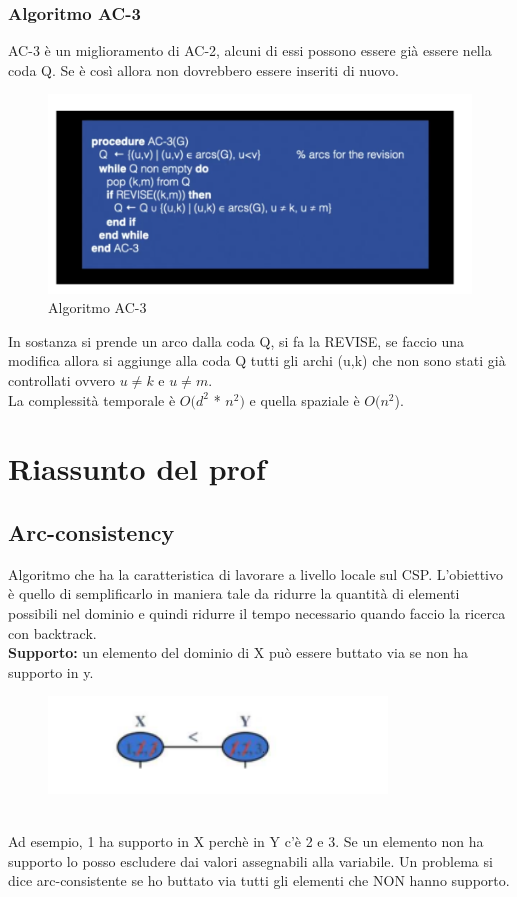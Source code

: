 \subsubsection{Algoritmo AC-3}
AC-3 è un miglioramento di AC-2, alcuni di essi possono essere già essere nella coda Q. Se è così allora non dovrebbero essere inseriti di nuovo.
\begin{figure}[htp]
	\centering
    \includegraphics[width=13cm, keepaspectratio]{img/Cap3/ac-3.png}
    \caption{Algoritmo AC-3}
\end{figure}
In sostanza si prende un arco dalla coda Q, si fa la REVISE, se faccio una modifica allora si aggiunge alla coda Q tutti gli archi (u,k) che non sono stati già controllati ovvero $u \neq k$ e $u \neq m$.\\
La complessità temporale è $O(d^2$ * $n^2)$ e quella spaziale è $O(n^2$).

\section{Riassunto del prof}
\subsection{Arc-consistency}
Algoritmo che ha la caratteristica di lavorare a livello locale sul CSP. L’obiettivo è quello di semplificarlo in maniera tale da ridurre la quantità di elementi possibili nel dominio e quindi ridurre il tempo necessario quando faccio la ricerca con backtrack.
\\\textbf{Supporto: } un elemento del dominio di X può essere buttato via se non ha supporto in y.
\begin{figure}[htp]
	\centering
    \includegraphics[width=9cm, keepaspectratio]{img/Cap3/riassunto1.png}
\end{figure}
\\Ad esempio, 1 ha supporto in X perchè in Y c’è 2 e 3. Se un elemento non ha supporto lo posso escludere dai valori assegnabili alla variabile. Un problema si dice arc-consistente se ho buttato via tutti gli elementi che NON hanno supporto.

